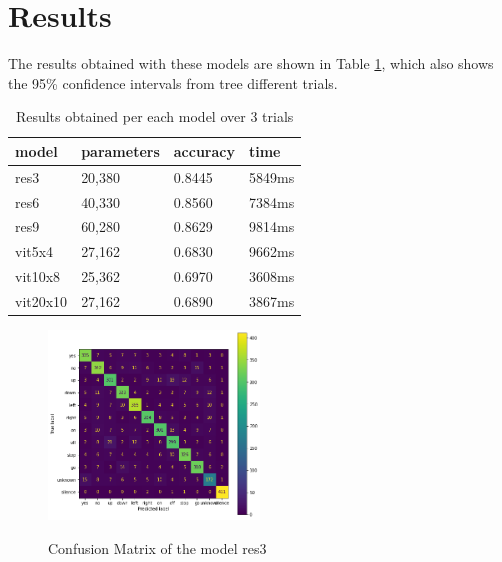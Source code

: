
\section{Results}
\label{sec:results}



The results obtained with these models are shown in Table \ref{table:results}, which also shows the 95\% confidence intervals from tree  different trials.

\begin{table}
	\centering
	\begin{tabular}{|l|l|l|l|}
    \hline
    model  & parameters & accuracy  & time \\
    \hline
    res3 & 20,380 & 0.8445 & 5849ms \\
    \hline
    res6 & 40,330 & 0.8560 & 7384ms\\
    \hline
    res9 & 60,280 & 0.8629 & 9814ms \\
    \hline
    vit5x4 & 27,162 & 0.6830 & 9662ms  \\
    \hline
    vit10x8  & 25,362 & 0.6970 & 3608ms  \\
    \hline
    vit20x10  & 27,162 & 0.6890 & 3867ms \\
    \hline
    \end{tabular} 
\label{table:results}
\caption{Results obtained per each model over 3 trials}
\end{table}

\begin{figure}[h]
    \centering
    \includegraphics[width=0.5\textwidth]{confusion_matrix_res3_keyword.png}
    \label{fig:confusionmatrix}
    \caption{Confusion Matrix of the model res3}
\end{figure}


